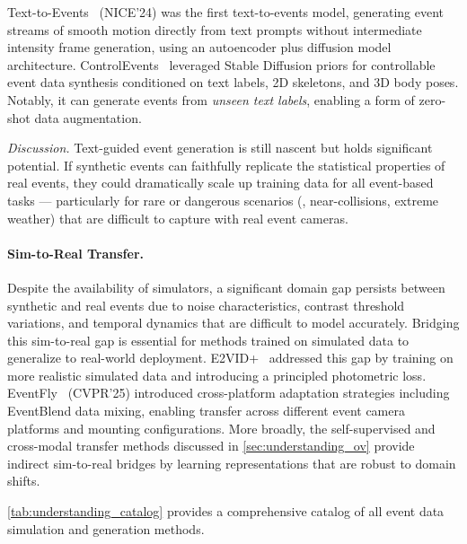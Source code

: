 Text-to-Events~\cite{barchid2024texttoevents} (NICE'24) was the first text-to-events model, generating event streams of smooth motion directly from text prompts without intermediate intensity frame generation, using an autoencoder plus diffusion model architecture. ControlEvents~\cite{wu2025controlevents} leveraged Stable Diffusion priors for controllable event data synthesis conditioned on text labels, 2D skeletons, and 3D body poses. Notably, it can generate events from \textit{unseen text labels}, enabling a form of zero-shot data augmentation.

\textit{Discussion.} Text-guided event generation is still nascent but holds significant potential. If synthetic events can faithfully replicate the statistical properties of real events, they could dramatically scale up training data for all event-based tasks --- particularly for rare or dangerous scenarios (\eg, near-collisions, extreme weather) that are difficult to capture with real event cameras.

\paragraph{Sim-to-Real Transfer.}
Despite the availability of simulators, a significant domain gap persists between synthetic and real events due to noise characteristics, contrast threshold variations, and temporal dynamics that are difficult to model accurately. Bridging this sim-to-real gap is essential for methods trained on simulated data to generalize to real-world deployment. E2VID+~\cite{stoffregen2020hqf} addressed this gap by training on more realistic simulated data and introducing a principled photometric loss. EventFly~\cite{kong2025eventfly} (CVPR'25) introduced cross-platform adaptation strategies including EventBlend data mixing, enabling transfer across different event camera platforms and mounting configurations. More broadly, the self-supervised and cross-modal transfer methods discussed in \cref{sec:understanding_ov} provide indirect sim-to-real bridges by learning representations that are robust to domain shifts.

\cref{tab:understanding_catalog} provides a comprehensive catalog of all event data simulation and generation methods.
